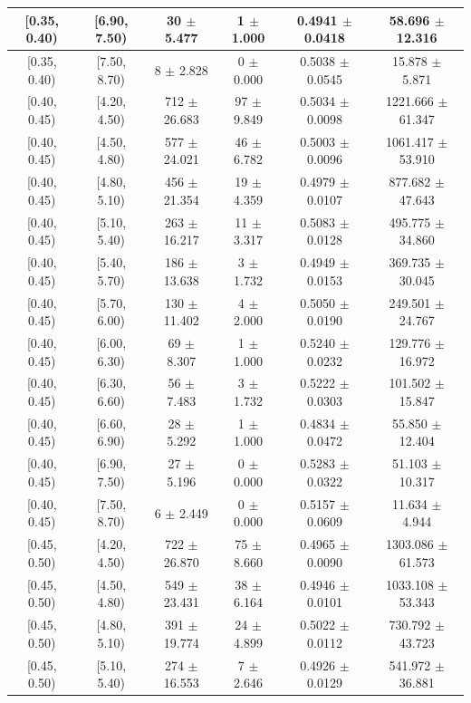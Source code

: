 \begin{longtable}{|c|c|c|c|c|c|}
\hline
[0.35, 0.40) & [6.90, 7.50) & 30 $\pm$ 5.477 & 1 $\pm$ 1.000 & 0.4941 $\pm$ 0.0418 & 58.696 $\pm$ 12.316 \\ 
\hline
[0.35, 0.40) & [7.50, 8.70) & 8 $\pm$ 2.828 & 0 $\pm$ 0.000 & 0.5038 $\pm$ 0.0545 & 15.878 $\pm$ 5.871 \\ 
\hline
[0.40, 0.45) & [4.20, 4.50) & 712 $\pm$ 26.683 & 97 $\pm$ 9.849 & 0.5034 $\pm$ 0.0098 & 1221.666 $\pm$ 61.347 \\ 
\hline
[0.40, 0.45) & [4.50, 4.80) & 577 $\pm$ 24.021 & 46 $\pm$ 6.782 & 0.5003 $\pm$ 0.0096 & 1061.417 $\pm$ 53.910 \\ 
\hline
[0.40, 0.45) & [4.80, 5.10) & 456 $\pm$ 21.354 & 19 $\pm$ 4.359 & 0.4979 $\pm$ 0.0107 & 877.682 $\pm$ 47.643 \\ 
\hline
[0.40, 0.45) & [5.10, 5.40) & 263 $\pm$ 16.217 & 11 $\pm$ 3.317 & 0.5083 $\pm$ 0.0128 & 495.775 $\pm$ 34.860 \\ 
\hline
[0.40, 0.45) & [5.40, 5.70) & 186 $\pm$ 13.638 & 3 $\pm$ 1.732 & 0.4949 $\pm$ 0.0153 & 369.735 $\pm$ 30.045 \\ 
\hline
[0.40, 0.45) & [5.70, 6.00) & 130 $\pm$ 11.402 & 4 $\pm$ 2.000 & 0.5050 $\pm$ 0.0190 & 249.501 $\pm$ 24.767 \\ 
\hline
[0.40, 0.45) & [6.00, 6.30) & 69 $\pm$ 8.307 & 1 $\pm$ 1.000 & 0.5240 $\pm$ 0.0232 & 129.776 $\pm$ 16.972 \\ 
\hline
[0.40, 0.45) & [6.30, 6.60) & 56 $\pm$ 7.483 & 3 $\pm$ 1.732 & 0.5222 $\pm$ 0.0303 & 101.502 $\pm$ 15.847 \\ 
\hline
[0.40, 0.45) & [6.60, 6.90) & 28 $\pm$ 5.292 & 1 $\pm$ 1.000 & 0.4834 $\pm$ 0.0472 & 55.850 $\pm$ 12.404 \\ 
\hline
[0.40, 0.45) & [6.90, 7.50) & 27 $\pm$ 5.196 & 0 $\pm$ 0.000 & 0.5283 $\pm$ 0.0322 & 51.103 $\pm$ 10.317 \\ 
\hline
[0.40, 0.45) & [7.50, 8.70) & 6 $\pm$ 2.449 & 0 $\pm$ 0.000 & 0.5157 $\pm$ 0.0609 & 11.634 $\pm$ 4.944 \\ 
\hline
[0.45, 0.50) & [4.20, 4.50) & 722 $\pm$ 26.870 & 75 $\pm$ 8.660 & 0.4965 $\pm$ 0.0090 & 1303.086 $\pm$ 61.573 \\ 
\hline
[0.45, 0.50) & [4.50, 4.80) & 549 $\pm$ 23.431 & 38 $\pm$ 6.164 & 0.4946 $\pm$ 0.0101 & 1033.108 $\pm$ 53.343 \\ 
\hline
[0.45, 0.50) & [4.80, 5.10) & 391 $\pm$ 19.774 & 24 $\pm$ 4.899 & 0.5022 $\pm$ 0.0112 & 730.792 $\pm$ 43.723 \\ 
\hline
[0.45, 0.50) & [5.10, 5.40) & 274 $\pm$ 16.553 & 7 $\pm$ 2.646 & 0.4926 $\pm$ 0.0129 & 541.972 $\pm$ 36.881 \\ 

\end{longtable}
